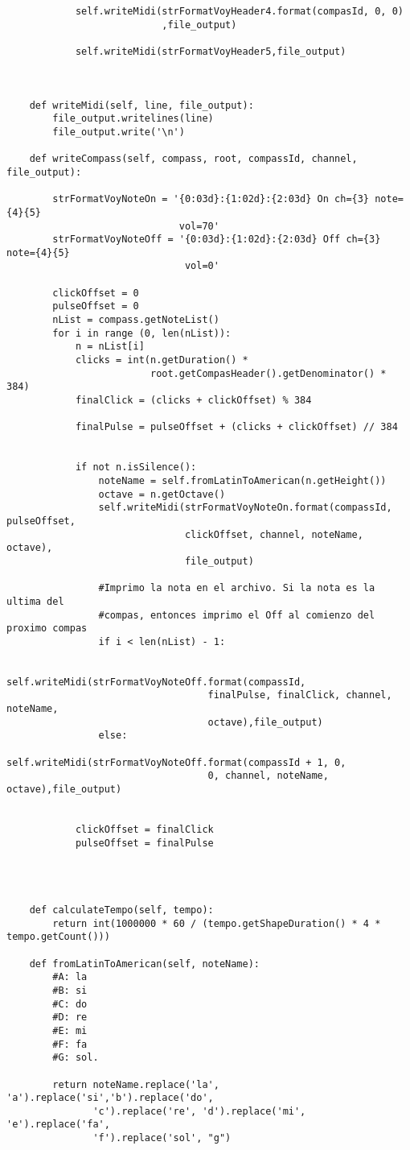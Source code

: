 \begin{verbatim}
            self.writeMidi(strFormatVoyHeader4.format(compasId, 0, 0)
                           ,file_output)

            self.writeMidi(strFormatVoyHeader5,file_output)



    def writeMidi(self, line, file_output):
        file_output.writelines(line)
        file_output.write('\n')

    def writeCompass(self, compass, root, compassId, channel, file_output):

        strFormatVoyNoteOn = '{0:03d}:{1:02d}:{2:03d} On ch={3} note={4}{5}
                              vol=70'
        strFormatVoyNoteOff = '{0:03d}:{1:02d}:{2:03d} Off ch={3} note={4}{5}
                               vol=0'

        clickOffset = 0
        pulseOffset = 0
        nList = compass.getNoteList()
        for i in range (0, len(nList)):
            n = nList[i]
            clicks = int(n.getDuration() *
                         root.getCompasHeader().getDenominator() * 384)
            finalClick = (clicks + clickOffset) % 384

            finalPulse = pulseOffset + (clicks + clickOffset) // 384


            if not n.isSilence():
                noteName = self.fromLatinToAmerican(n.getHeight())
                octave = n.getOctave()
                self.writeMidi(strFormatVoyNoteOn.format(compassId, pulseOffset,
                               clickOffset, channel, noteName, octave), 
                               file_output)

                #Imprimo la nota en el archivo. Si la nota es la ultima del
                #compas, entonces imprimo el Off al comienzo del proximo compas
                if i < len(nList) - 1:

                    self.writeMidi(strFormatVoyNoteOff.format(compassId,
                                   finalPulse, finalClick, channel, noteName,
                                   octave),file_output)
                else:
                    self.writeMidi(strFormatVoyNoteOff.format(compassId + 1, 0,
                                   0, channel, noteName, octave),file_output)


            clickOffset = finalClick
            pulseOffset = finalPulse




    def calculateTempo(self, tempo):
        return int(1000000 * 60 / (tempo.getShapeDuration() * 4 * tempo.getCount()))

    def fromLatinToAmerican(self, noteName):
        #A: la
        #B: si
        #C: do
        #D: re
        #E: mi
        #F: fa
        #G: sol.

        return noteName.replace('la', 'a').replace('si','b').replace('do',
               'c').replace('re', 'd').replace('mi', 'e').replace('fa',
               'f').replace('sol', "g")
\end{verbatim}